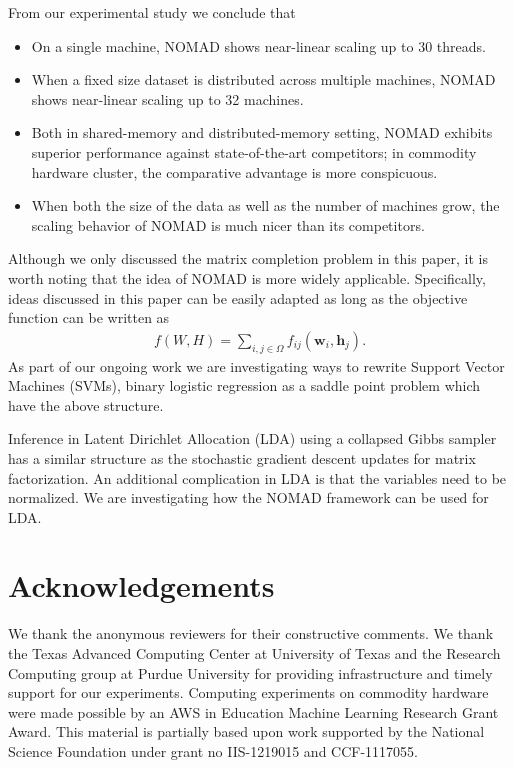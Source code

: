 \documentclass{vldb}
\newcommand{\hb}{\mathbf{h}}
\newcommand{\wb}{\mathbf{w}}
\begin{document}
From our experimental study we conclude that
\begin{itemize}
\item On a single machine, NOMAD shows near-linear scaling up to 30
  threads.
\item When a fixed size dataset is distributed across multiple
  machines, NOMAD shows near-linear scaling up to 32 machines.
\item Both in shared-memory and distributed-memory setting, NOMAD
  exhibits superior performance against state-of-the-art competitors;
  in commodity hardware cluster, the comparative advantage is more
  conspicuous.
\item When both the size of the data as well as the number of machines
  grow, the scaling behavior of NOMAD is much nicer than its
  competitors.
\end{itemize}

Although we only discussed the matrix completion problem in this paper,
it is worth noting that the idea of NOMAD is more widely
applicable. Specifically, ideas discussed in this paper can be easily
adapted as long as the objective function can be written as
\begin{align*}
  f(W,H) = \sum_{i,j \in \Omega} f_{ij}(\wb_i, \hb_j).
\end{align*}
As part of our ongoing work we are investigating ways to rewrite
Support Vector Machines (SVMs), binary logistic regression as a saddle
point problem which have the above structure. 

Inference in Latent Dirichlet Allocation (LDA) using a collapsed Gibbs
sampler has a similar structure as the stochastic gradient descent
updates for matrix factorization. An additional complication in LDA is
that the variables need to be normalized. We are investigating how the
NOMAD framework can be used for LDA. 







\balance

\section{Acknowledgements}
\label{sec:Acknowledgements}

We thank the anonymous reviewers for their constructive comments.  We
thank the Texas Advanced Computing Center at University of Texas and
the Research Computing group at Purdue University for providing
infrastructure and timely support for our experiments. Computing
experiments on commodity hardware were made possible by an AWS in
Education Machine Learning Research Grant Award. This material is
partially based upon work supported by the National Science Foundation
under grant no IIS-1219015 and CCF-1117055.
\end{document}
